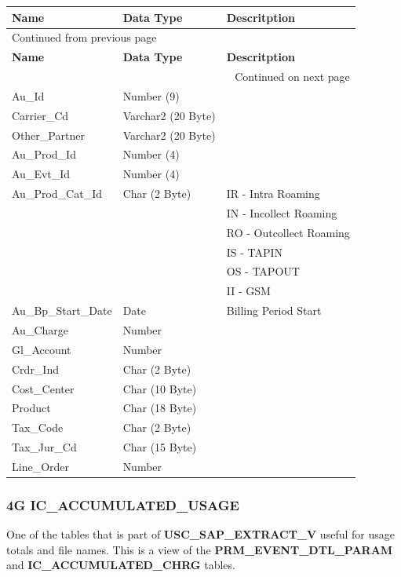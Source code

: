 \documentclass[12pt,twoside]{article}
\begin{document}
\begin{longtable}{l|l|l}
\hline
\textbf{Name} & \textbf{Data Type} & \textbf{Descritption}\\
\hline
\endfirsthead
\multicolumn{3}{l}{Continued from previous page} \\
\hline

\textbf{Name} & \textbf{Data Type} & \textbf{Descritption} \\

\hline
\endhead
\hline\multicolumn{3}{r}{Continued on next page} \\
\endfoot
\endlastfoot
\hline
Au\_Id & Number (9) & \\
Carrier\_Cd & Varchar2 (20 Byte) & \\
Other\_Partner & Varchar2 (20 Byte) & \\
Au\_Prod\_Id & Number (4) & \\
Au\_Evt\_Id & Number (4) & \\
Au\_Prod\_Cat\_Id & Char (2 Byte) & IR - Intra Roaming\\
 &  & IN - Incollect Roaming\\
 &  & RO - Outcollect Roaming\\
 &  & IS - TAPIN\\
 &  & OS - TAPOUT\\
 &  & II - GSM\\
Au\_Bp\_Start\_Date & Date & Billing Period Start\\
Au\_Charge & Number & \\
Gl\_Account & Number & \\
Crdr\_Ind & Char (2 Byte) & \\
Cost\_Center & Char (10 Byte) & \\
Product & Char (18 Byte) & \\
Tax\_Code & Char (2 Byte) & \\
Tax\_Jur\_Cd & Char (15 Byte) & \\
Line\_Order & Number & \\
\hline
\end{longtable}
\normalsize
\subsubsection{4G IC\_ACCUMULATED\_USAGE}
\label{sec:orgheadline138}
One of the tables that is part of \textbf{USC\_SAP\_EXTRACT\_V} useful for usage totals and file names. This is a view of the \textbf{PRM\_EVENT\_DTL\_PARAM} and \textbf{IC\_ACCUMULATED\_CHRG} tables.
\footnotesize
\end{document}
